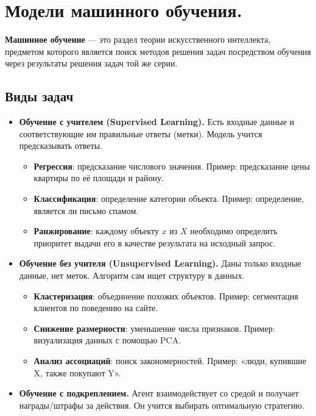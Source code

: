 \section{Модели машинного обучения.}

\textbf{Машинное обучение} — это раздел теории искусственного интеллекта, предметом которого является поиск методов решения задач посредством обучения через результаты решения задач той же серии.

\subsection*{Виды задач}

\begin{itemize}
  \item \textbf{Обучение с учителем (Supervised Learning).} Есть входные данные и соответствующие им правильные ответы (метки). Модель учится предсказывать ответы.
  \begin{itemize}
    \item \textbf{Регрессия}: предсказание числового значения. Пример: предсказание цены квартиры по её площади и району.
    \item \textbf{Классификация}: определение категории объекта. Пример: определение, является ли письмо спамом.
    \item \textbf{Ранжирование}: каждому объекту $x$ из $X$ необходимо определить приоритет выдачи его в качестве результата на исходный запрос.
  \end{itemize}

  \item \textbf{Обучение без учителя (Unsupervised Learning).} Даны только входные данные, нет меток. Алгоритм сам ищет структуру в данных.
  \begin{itemize}
    \item \textbf{Кластеризация}: объединение похожих объектов. Пример: сегментация клиентов по поведению на сайте.
    \item \textbf{Снижение размерности}: уменьшение числа признаков. Пример: визуализация данных с помощью PCA.
    \item \textbf{Анализ ассоциаций}: поиск закономерностей. Пример: «люди, купившие X, также покупают Y».
  \end{itemize}

  \item \textbf{Обучение с подкреплением.} Агент взаимодействует со средой и получает награды/штрафы за действия. Он учится выбирать оптимальную стратегию.
\end{itemize}

